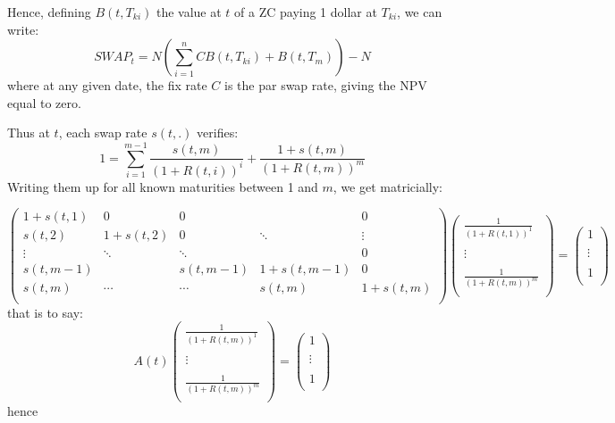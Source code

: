 \par Hence, defining $B(t,T_{ki}) $ the value at $t$ of a ZC paying 1 dollar at $T_{ki}$, we can write:
$$ SWAP_{t}=N \left(\sum_{i=1}^{n}C B(t, T_{ki})+B(t, T_{m}) \right)-N $$
where at any given date, the fix rate $C$ is the par swap rate, giving the NPV equal to zero.

\par Thus at $t$, each swap rate $s(t,.)$ verifies:
$$1=\sum_{i=1}^{m-1} \frac{s(t,m)}{\left(1+R(t,i)\right)^i} + \frac{1+s(t,m)}{\left(1+R(t,m)\right)^m}$$
Writing them up for all known maturities between 1 and $m$, we get matricially:

$$\left(
\begin{array}{ccccc}
1+s(t,1) & 0 & 0 &  & 0 \\
s(t, 2) & 1+s(t,2) & 0 & \ddots & \vdots \\
\vdots & \ddots & \ddots & & 0 \\
s(t,m-1) & & s(t,m-1)& 1+s(t,m-1)& 0 \\
s(t,m) & \cdots & \cdots & s(t,m) & 1+s(t,m) \\
\end{array}
\right) \left(
\begin{array}{c}
\frac{1}{\left(1+R(t,1)\right)^1} \\
\\
\vdots\\
\\
\frac{1}{\left(1+R(t,m)\right)^m} \\
\end{array}
\right)= \left(
\begin{array}{c}
1 \\
\\
\vdots\\
\\
1 \\
\end{array}
\right)
$$
that is to say:
$$ A(t) \left(
\begin{array}{c}
\frac{1}{\left(1+R(t,m)\right)^1} \\
\\
\vdots\\
\\
\frac{1}{\left(1+R(t,m)\right)^m} \\
\end{array}
\right)= \left(
\begin{array}{c}
1 \\
\\
\vdots\\
\\
1 \\
\end{array}
\right)
$$hence
